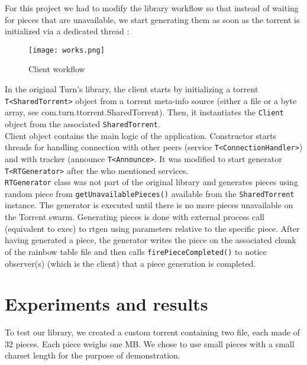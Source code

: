 \documentclass[a4paper]{article}
\begin{document}
{For this project we had to modify the library workflow so that instead of waiting for pieces that are unavailable, we start generating them as soon as the torrent is initialized via a dedicated thread :\\

\vspace{2mm}
\begin{figure}[H]
  \centering
    \texttt{[image: works.png]}
    \caption{Client workflow}
    \label{works}
\end{figure}
\vspace{2mm}

In the original Turn's library, the client starts by initializing a torrent \texttt{T<SharedTorrent>} object from a torrent meta-info source (either a file or a byte array, see com.turn.ttorrent.SharedTorrent). Then, it instantiates the \texttt{Client} object from the associated \texttt{SharedTorrent}.\\

Client object contains the main logic of the application. Constructor starts threads for handling connection with other peers (service \texttt{T<ConnectionHandler>}) and with tracker (announce \texttt{T<Announce>}. It was modified to start generator \texttt{T<RTGenerator>} after the who mentioned services.\\

\texttt{RTGenerator} class was not part of the original library and generates pieces using random piece from \texttt{getUnavailablePieces()} available from the \texttt{SharedTorrent} instance. The generator is executed until there is no more pieces unavailable on the Torrent swarm. Generating pieces is done with external process call (equivalent to exec) to rtgen using parameters relative to the specific piece. After having generated a piece, the generator writes the piece on the associated chunk of the rainbow table file and then calls \texttt{firePieceCompleted()} to notice observer(s) (which is the client) that a piece generation is completed.\\

\section{Experiments and results}

To test our library, we created a custom torrent containing two file, each made of 32 pieces. Each piece weighs one MB. We chose to use small pieces with a small charset length for the purpose of demonstration.\\

}
\end{document}
